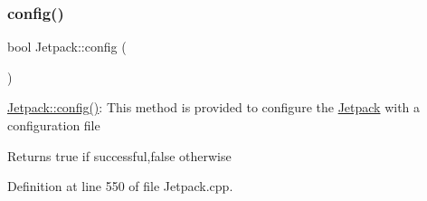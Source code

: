 \subsubsection{\texorpdfstring{config()}{config()}}
{\footnotesize\ttfamily bool Jetpack\+::config (\begin{DoxyParamCaption}{ }\end{DoxyParamCaption})}

\hyperlink{class_jetpack_ab065ee83e244265a2223a22f3ee4a719}{Jetpack\+::config()}\+: This method is provided to configure the \hyperlink{class_jetpack}{Jetpack} with a configuration file

\begin{DoxyReturn}{Returns}
true if successful,false otherwise 
\end{DoxyReturn}


Definition at line 550 of file Jetpack.\+cpp.


